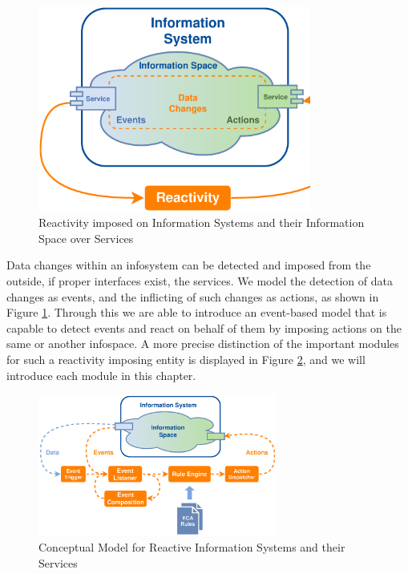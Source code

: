 \begin{figure}[!ht]
  \centering
  \includegraphics[width=0.8\textwidth]{figures/IS_InformationSpace}
  \caption{Reactivity imposed on Information Systems and their Information Space over Services}
  \label{fig:IS_InformationSpace}
\end{figure}
Data changes within an \textrm{\gls{infosystem}} can be detected and imposed from the outside, if proper interfaces exist, the services.
We model the detection of data changes as events, and the inflicting of such changes as actions, as shown in Figure \ref{fig:IS_InformationSpace}.
Through this we are able to introduce an event-based model that is capable to detect events and react on behalf of them by imposing actions on the same or another \textrm{\gls{infospace}}.
A more precise distinction of the important modules for such a reactivity imposing entity is displayed in Figure \ref{fig:Standard-Model-Template}, and we will introduce each module in this chapter.
\begin{figure}[!ht]
  \centering
  \includegraphics[width=0.7\textwidth]{figures/Standard-Model-Template}
  \caption{Conceptual Model for Reactive Information Systems and their Services}
  \label{fig:Standard-Model-Template}
\end{figure}



